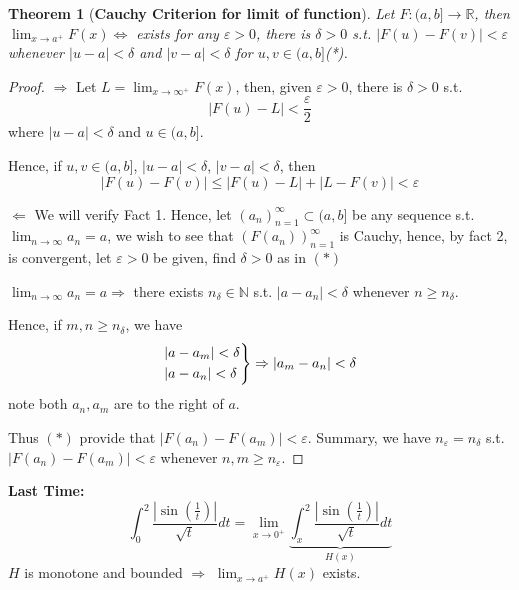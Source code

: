 \documentclass[12pt]{article}
\theoremstyle{plain}
\newtheorem{theorem}{Theorem}[subsection]
\newcommand{\abs}[1]{\left| #1 \right|}
\newcommand{\mN}{{\mathbb{N}}}
\newcommand{\mR}{{\mathbb{R}}}
\newcommand{\ep}{\varepsilon}
\begin{document}
\begin{theorem}[\textbf{Cauchy Criterion for limit of function}]
	Let $F:(a,b]\to \mR$, then 
	$\lim_{x\to a^+} F(x) \Leftrightarrow$ exists
	for any $\ep>0$, there is $\delta > 0$ s.t. $\abs{F(u)-F(v)}<\ep$
	whenever $\abs{u-a}<\delta$ and $\abs{v-a}<\delta$ for $u,v \in (a,b]$(*).
\end{theorem}
\begin{proof}
	$\Rightarrow$ Let $L = \lim_{x\to \infty^+} F(x)$, then, given $\ep>0$, 
	there is $\delta > 0$ s.t. 
	\[
		\abs{F(u) - L} < \frac{\ep}2
	\]
	where $\abs{u-a} < \delta$ and $u \in (a,b]$. 

	Hence, if $u, v \in (a,b]$, $\abs{u-a} < \delta$, $\abs{v-a} < \delta$, then 
	\[
		\abs{F(u)- F(v)} \leq \abs{F(u) - L} + \abs{L-F(v)} < \ep
	\]

	$\Leftarrow$ We will verify Fact 1. Hence, let $(a_n)_{n=1}^{\infty} \subset
	(a,b]$ be any sequence s.t. $\lim_{n\to\infty} a_n = a$, we wish to see 
	that $(F(a_n))_{n=1}^{\infty}$ is Cauchy, hence, by fact 2, is convergent,
	let $\ep>0$ be given, find $\delta > 0$ as in $(*)$

	$\lim_{n\to\infty} a_n =a \Rightarrow$ there exists $n_{\delta} \in \mN$
	s.t. $\abs{a-a_n} < \delta$ whenever $n \geq n_{\delta}$. 

	Hence, if $m,n \geq n_{\delta}$, we have 
	\[
		\begin{rcases}
			\abs{a-a_m} < \delta\\
			\abs{a-a_n} < \delta
		\end{rcases}
		\Rightarrow \abs{a_m-a_n} < \delta
	\]
	note both $a_n, a_m$ are to the right of $a$. 

	Thus $(*)$ provide that $\abs{F(a_n)-F(a_m)} < \ep$. Summary, we have
	$n_{\ep} = n_{\delta}$ s.t. $\abs{F(a_n)-F(a_m)} < \ep$ whenever
	$n,m \geq n_{\ep}$. 
\end{proof}


\textbf{Last Time: } 
\[
	\int_0^2 \frac{\abs{\sin (\frac 1t)}}{\sqrt t} dt =\lim_{x\to 0^+}
	\underbrace{\int_x^2 \frac{\abs{\sin (\frac 1t)}}{\sqrt t} dt}_{H(x)}
\]
$H$ is monotone and bounded $\Rightarrow$ $\lim_{x\to a^+} H(x)$ exists. \\
\end{document}
